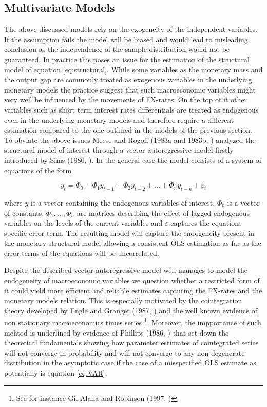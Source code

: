 \subsection{Multivariate Models}
\label{sub:multivariate}
The above discussed models rely on the exogeneity of the independent variables. If the assumption
fails the model will be biased and would lead to misleading conclusion as the independence of the
sample distribution would not be guaranteed. In practice this poses an issue for the estimation
of the structural model of equation \ref{eq:structural}. While some variables as the monetary
mass and the output gap are commonly treated as exogenous variables in the underlying monetary models
the practice suggest that such macroeconomic variables might very well be influenced by the
movements of FX-rates. On the top of it other variables such as short term interest rates differentials
are treated as endogenous even in the underlying monetary models and therefore require a different estimation
compared to the one outlined in the models of the previous section.\\
To obviate the above issues Meese and Rogoff (1983a and 1983b, \cite{MeeseRogoffa, MeeseRogoffb}) analyzed the structural model
of interest through a vector autoregressive model firstly introduced by Sims (1980, \cite{Sims1980}).
In the general case the model consists of a system of equations of the form

\begin{equation} \label{eq:VAR}
y_{t} =  \Phi_{0}+ \Phi_{1}y_{t-1} + \Phi_{2}y_{t-2} + \dots + \Phi_{n}y_{t-n} + \varepsilon_{t}
\end{equation}

where $y$ is a vector containing the endogenous variables of interest, $\Phi_0$ is a vector of constants,
$\Phi_1,  \dots  , \Phi_n$ are matrices describing the effect of lagged endogenous variables on the levels of
the current variables and $\varepsilon$ captures the equations specific error term.
The resulting model will capture the endogeneity present in the monetary structural model allowing a consistent
OLS estimation as far as the error terms of the equations will be uncorrelated.

Despite the described vector autoregressive model well manages to model the endogeneity of macroeconomic
variables we question whether a restricted form of it could yield more efficient and reliable estimates capturing
the FX-rates and the monetary models relation. This is especially motivated by the cointegration theory developed
by Engle and Granger (1987, \cite{EngleGranger}) and the well known evidence of non stationary macroeconomics
times series \footnote{See for instance Gil-Alana and Robinson (1997, \cite{GilAlanaRobinson})}. Moreover, the impportance
of such mehtod is underlined by evidence of Phillips (1986, \cite{Phillips}) that set down the theoretical fundamentals
showing how parameter estimates of cointegrated series will not converge in probability and will not converge to any
non-degenerate distribution in the asymptotic case if the case of a misspecified OLS estimate as potentially is equation \ref{eq:VAR}.

